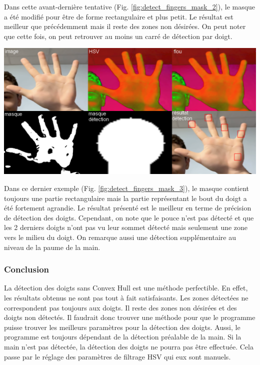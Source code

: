\documentclass[11pt]{article}
\begin{document}
Dans cette avant-dernière tentative (Fig. \ref{fig:detect_fingers_mask_2}), le masque a été modifié pour être de forme rectangulaire et plus petit. Le résultat est meilleur que précédemment mais il reste des zones non désirées. On peut noter que cette fois, on peut retrouver au moins un carré de détection par doigt.

\begin{center}
    \includegraphics[width=\textwidth]{images/detect_fingers_mask_3.png}
    \label{fig:detect_fingers_mask_3}
\end{center}

Dans ce dernier exemple (Fig. \ref{fig:detect_fingers_mask_3}), le masque contient toujours une partie rectangulaire mais la partie représentant le bout du doigt a été fortement agrandie.
Le résultat présenté est le meilleur en terme de précision de détection des doigts. Cependant, on note que le pouce n'est pas détecté et que les 2 derniers doigts n'ont pas vu leur sommet détecté mais seulement une zone vers le milieu du doigt. On remarque aussi une détection supplémentaire au niveau de la paume de la main.

\subsubsection{Conclusion}
La détection des doigts sans Convex Hull est une méthode perfectible. En effet, les résultats obtenus ne sont pas tout à fait satisfaisants. Les zones détectées ne correspondent pas toujours aux doigts. Il reste des zones non désirées et des doigts non détectés. Il faudrait donc trouver une méthode pour que le programme puisse trouver les meilleurs paramètres pour la détection des doigts.
Aussi, le programme est toujours dépendant de la détection préalable de la main. Si la main n'est pas détectée, la détection des doigts ne pourra pas être effectuée. Cela passe par le réglage des paramètres de filtrage HSV qui eux sont manuels.
\end{document}
